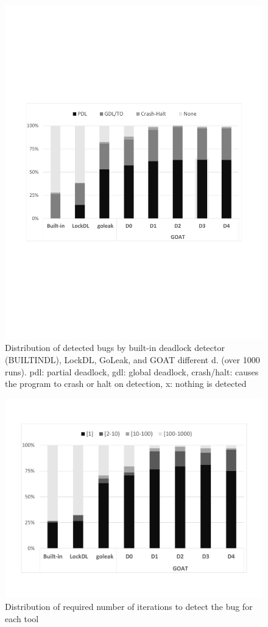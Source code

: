 \begin{figure}
\centering
  \includegraphics[width=.95\linewidth]{figs/P4_detections.pdf}
  \caption{Distribution of detected bugs by built-in deadlock detector (BUILTINDL), LockDL, GoLeak, and GOAT different d. (over 1000 runs). pdl: partial deadlock, gdl: global deadlock, crash/halt: causes the program to crash or halt on detection, x: nothing is detected }
  \label{fig:detection}
\end{figure}


\begin{figure}
\centering
  \includegraphics[width=.95\linewidth]{figs/P4_runs.pdf}
  \caption{Distribution of required number of iterations to detect the bug for each tool}
  \label{fig:runs}
\end{figure}


